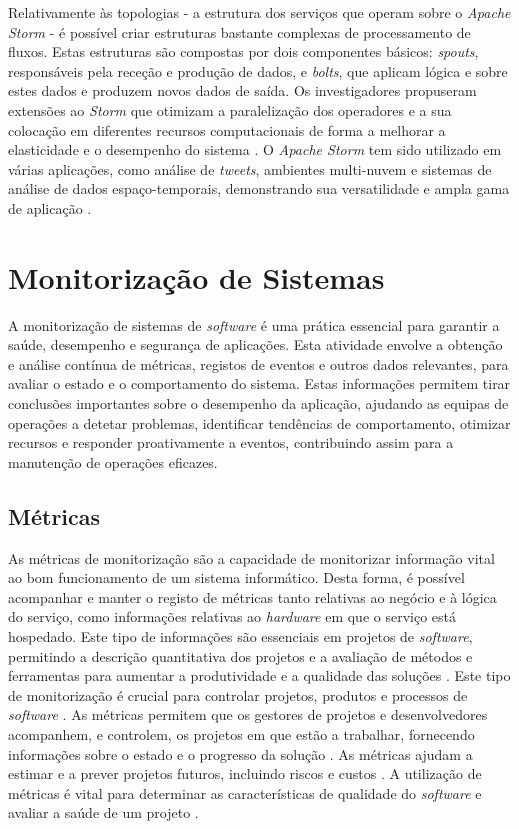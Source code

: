 Relativamente às topologias - a estrutura dos serviços que operam sobre o \textit{Apache Storm} - 
é possível criar estruturas bastante complexas de processamento de fluxos. Estas estruturas são 
compostas por dois componentes básicos: \textit{spouts}, responsáveis pela receção e produção de 
dados, e \textit{bolts}, que aplicam lógica e sobre estes dados e produzem novos dados de saída. 
Os investigadores propuseram extensões ao \textit{Storm} que otimizam a paralelização dos 
operadores e a sua colocação em diferentes recursos computacionais de forma a melhorar a 
elasticidade e o desempenho do sistema \cite{storm2017d} . O \textit{Apache Storm} tem sido 
utilizado em várias aplicações, como análise de \textit{tweets}, ambientes multi-nuvem e sistemas 
de análise de dados espaço-temporais, demonstrando sua versatilidade e ampla gama de aplicação 
\cite{storm2018d} \cite{storm2020} \cite{storm2021}.

\section{Monitorização de Sistemas}

A monitorização de sistemas de \textit{software} é uma prática essencial para garantir a saúde, 
desempenho e segurança de aplicações. Esta atividade envolve a obtenção e análise contínua de métricas, 
registos de eventos e outros dados relevantes, para avaliar o estado e o comportamento 
do sistema. Estas informações permitem tirar conclusões importantes sobre o desempenho da aplicação, 
ajudando as equipas de operações a detetar problemas, identificar tendências de comportamento, 
otimizar recursos e responder proativamente a eventos, contribuindo assim para a manutenção de 
operações eficazes.

\subsection{Métricas}

As métricas de monitorização são a capacidade de monitorizar informação vital ao bom funcionamento
de um sistema informático. Desta forma, é possível acompanhar e manter o registo de métricas tanto
relativas ao negócio e à lógica do serviço, como informações relativas ao \textit{hardware} em que
o serviço está hospedado. Este tipo de informações são essenciais em projetos de \textit{software}, 
permitindo a descrição quantitativa dos projetos e a avaliação de métodos e ferramentas para 
aumentar a produtividade e a qualidade das soluções \cite{metrics2003}. Este tipo de monitorização 
é crucial para controlar projetos, produtos e processos de \textit{software} \cite{metrics2019}. 
As métricas permitem que os gestores de projetos e desenvolvedores acompanhem, e controlem, os 
projetos em que estão a trabalhar, fornecendo informações sobre o estado e o progresso da solução 
\cite{metrics2016}. As métricas ajudam a estimar e a prever projetos futuros, incluindo riscos e 
custos \cite{metrics2016b}. A utilização de métricas é vital para determinar as características de 
qualidade do \textit{software} e avaliar a saúde de um projeto \cite{metrics2015}.

